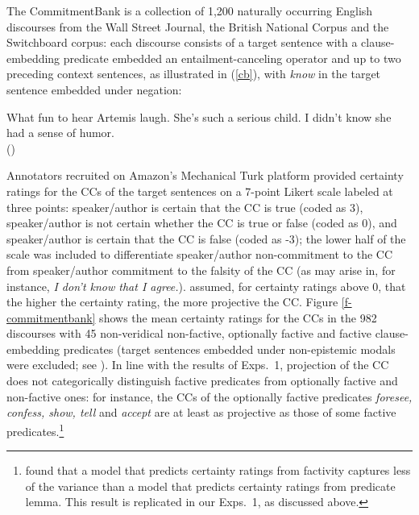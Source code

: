 \documentclass[11pt,fleqn]{article}
\newcommand{\6}{\mbox{$[\hspace*{-.6mm}[$}}
\newcommand{\9}{\mbox{$]\hspace*{-.6mm}]$}}
\begin{document}
The CommitmentBank is a collection of 1,200 naturally occurring English discourses from the Wall Street Journal, the British National Corpus and the Switchboard corpus: each discourse consists of a target sentence with a clause-embedding predicate embedded an entailment-canceling operator and up to two preceding context sentences, as illustrated in (\ref{cb}), with {\em know} in the target sentence embedded under negation:

\begin{exe}
\ex\label{cb} What fun to hear Artemis laugh. She's such a serious child. I didn't know she had a sense of humor. \\ \hspace*{.2cm} \hfill (\citealt[109]{demarneffe-etal-sub23})
\end{exe}
Annotators recruited on Amazon's Mechanical Turk platform provided certainty ratings for the CCs of the target sentences on a 7-point Likert scale labeled at three points: speaker/author is certain that the CC is true (coded as 3), speaker/author is not certain whether the CC is true or false (coded as 0), and speaker/author is certain that the CC is false (coded as -3); the lower half of the scale was included to differentiate speaker/author non-commitment to the CC from speaker/author commitment to the falsity of the CC (as may arise in, for instance, {\em I don't know that I agree.}). \citet{demarneffe-etal-sub23} assumed, for certainty ratings above 0, that the higher the certainty rating, the more projective the CC. Figure \ref{f-commitmentbank} shows the mean certainty ratings for the CCs in the 982 discourses with 45 non-veridical non-factive, optionally factive and factive clause-embedding predicates (target sentences embedded under non-epistemic modals were excluded; see \citealt[\S3]{demarneffe-etal-sub23}). In line with the results of Exps.~1, projection of the CC does not categorically distinguish factive predicates from optionally factive and non-factive ones: for instance, the CCs of the optionally factive predicates {\em foresee, confess, show, tell} and {\em accept} are at least as projective as those of some factive predicates.\footnote{\citealt{demarneffe-etal-sub23} found that a model that predicts certainty ratings from factivity captures less of the variance than a model that predicts certainty ratings from predicate lemma. This result is replicated in our Exps.~1, as discussed above.}
\end{document}
